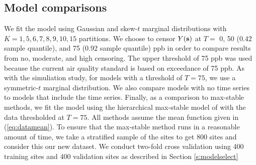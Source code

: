 \documentclass[11pt]{article}
\begin{document}


\subsection{Model comparisons}
We fit the model using Gaussian and skew-$t$ marginal distributions with $K=1, 5, 6, 7, 8, 9, 10, 15$ partitions.
We choose to censor $Y(\mbox{\bf s})$ at $T =$ 0, 50 (0.42 sample quantile), and 75 (0.92 sample quantile) ppb in order to compare results from no, moderate, and high censoring.
The upper threshold of 75 ppb was used because the current air quality standard is based on exceedance of 75 ppb.
As with the simuliation study, for models with a threshold of $T = 75$, we use a symmetric-$t$ marginal distribution.
We also compare models with no time series to models that include the time series.
Finally, as a comparison to max-stable methods, we fit the model using the hierarchical max-stable model of \citet{Reich2012} with the data thresholded at $T = 75$.
All methods assume the mean function given in (\ref{eq:datamean}).
To ensure that the max-stable method runs in a reasonable amount of time, we take a stratified sample of the sites to get 800 sites and consider this our new dataset.
We conduct two-fold cross validation using 400 training sites and 400 validation sites as described in Section \ref{s:modelselect}
\end{document}
